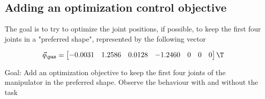 	\subsection{Adding an optimization control objective}
	\question
	The goal is to try to optimize the joint positions, if possible, to keep the
	first four joints in a "preferred shape", represented by the following vector

	\begin{displaymath}
		\vec{q}_{\pas} = 
		\begin{bmatrix}
			-0.0031 & 1.2586 & 0.0128 & -1.2460 & 0 & 0 & 0
		\end{bmatrix}\T
	\end{displaymath}

	Goal: Add an optimization objective to keep the first four joints of the
	manipulator in the preferred shape. Observe the behaviour with and without the
	task
